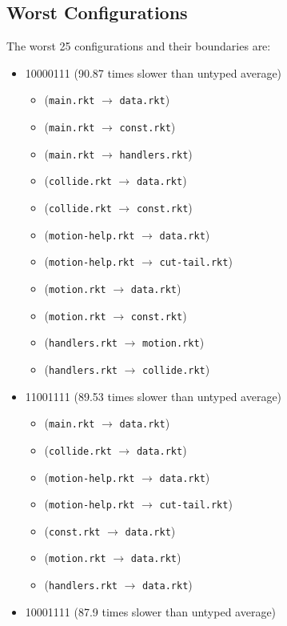 \documentclass{article}
\newcommand{\mono}[1]{\texttt{#1}}
\begin{document}
\subsection{Worst Configurations}
The worst 25 configurations and their boundaries are:
\begin{itemize}
\item 10000111 (90.87 times slower than untyped average)
  \begin{itemize}
  \item (\mono{main.rkt} $\rightarrow$ \mono{data.rkt})
  \item (\mono{main.rkt} $\rightarrow$ \mono{const.rkt})
  \item (\mono{main.rkt} $\rightarrow$ \mono{handlers.rkt})
  \item (\mono{collide.rkt} $\rightarrow$ \mono{data.rkt})
  \item (\mono{collide.rkt} $\rightarrow$ \mono{const.rkt})
  \item (\mono{motion-help.rkt} $\rightarrow$ \mono{data.rkt})
  \item (\mono{motion-help.rkt} $\rightarrow$ \mono{cut-tail.rkt})
  \item (\mono{motion.rkt} $\rightarrow$ \mono{data.rkt})
  \item (\mono{motion.rkt} $\rightarrow$ \mono{const.rkt})
  \item (\mono{handlers.rkt} $\rightarrow$ \mono{motion.rkt})
  \item (\mono{handlers.rkt} $\rightarrow$ \mono{collide.rkt})
  \end{itemize}
\item 11001111 (89.53 times slower than untyped average)
  \begin{itemize}
  \item (\mono{main.rkt} $\rightarrow$ \mono{data.rkt})
  \item (\mono{collide.rkt} $\rightarrow$ \mono{data.rkt})
  \item (\mono{motion-help.rkt} $\rightarrow$ \mono{data.rkt})
  \item (\mono{motion-help.rkt} $\rightarrow$ \mono{cut-tail.rkt})
  \item (\mono{const.rkt} $\rightarrow$ \mono{data.rkt})
  \item (\mono{motion.rkt} $\rightarrow$ \mono{data.rkt})
  \item (\mono{handlers.rkt} $\rightarrow$ \mono{data.rkt})
  \end{itemize}
\item 10001111 (87.9 times slower than untyped average)

\end{itemize}
\end{document}
